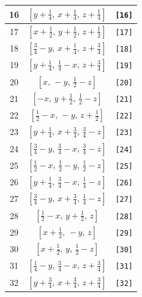 \documentclass[fleqn,8pt]{jsarticle}
\begin{document}
\begin{longtable}{ccc}
16 & $\left[ y + \frac{1}{4},\, x + \frac{1}{4},\, z + \frac{1}{4} \right]$ & {\tt [16]} \\ \hline
17 & $\left[ x + \frac{1}{2},\, y + \frac{1}{2},\, z + \frac{1}{2} \right]$ & {\tt [17]} \\ \hline
18 & $\left[ \frac{3}{4} - y,\, x + \frac{1}{4},\, z + \frac{3}{4} \right]$ & {\tt [18]} \\ \hline
19 & $\left[ y + \frac{1}{4},\, \frac{1}{4} - x,\, z + \frac{3}{4} \right]$ & {\tt [19]} \\ \hline
20 & $\left[ x,\, - y,\, \frac{1}{2} - z \right]$ & {\tt [20]} \\ \hline
21 & $\left[ - x,\, y + \frac{1}{2},\, \frac{1}{2} - z \right]$ & {\tt [21]} \\ \hline
22 & $\left[ \frac{1}{2} - x,\, - y,\, z + \frac{1}{2} \right]$ & {\tt [22]} \\ \hline
23 & $\left[ y + \frac{1}{4},\, x + \frac{3}{4},\, \frac{3}{4} - z \right]$ & {\tt [23]} \\ \hline
24 & $\left[ \frac{3}{4} - y,\, \frac{3}{4} - x,\, \frac{3}{4} - z \right]$ & {\tt [24]} \\ \hline
25 & $\left[ \frac{1}{2} - x,\, \frac{1}{2} - y,\, \frac{1}{2} - z \right]$ & {\tt [25]} \\ \hline
26 & $\left[ y + \frac{1}{4},\, \frac{3}{4} - x,\, \frac{1}{4} - z \right]$ & {\tt [26]} \\ \hline
27 & $\left[ \frac{3}{4} - y,\, x + \frac{3}{4},\, \frac{1}{4} - z \right]$ & {\tt [27]} \\ \hline
28 & $\left[ \frac{1}{2} - x,\, y + \frac{1}{2},\, z \right]$ & {\tt [28]} \\ \hline
29 & $\left[ x + \frac{1}{2},\, - y,\, z \right]$ & {\tt [29]} \\ \hline
30 & $\left[ x + \frac{1}{2},\, y,\, \frac{1}{2} - z \right]$ & {\tt [30]} \\ \hline
31 & $\left[ \frac{1}{4} - y,\, \frac{3}{4} - x,\, z + \frac{3}{4} \right]$ & {\tt [31]} \\ \hline
32 & $\left[ y + \frac{3}{4},\, x + \frac{3}{4},\, z + \frac{3}{4} \right]$ & {\tt [32]} \\
\end{longtable}
\end{document}
